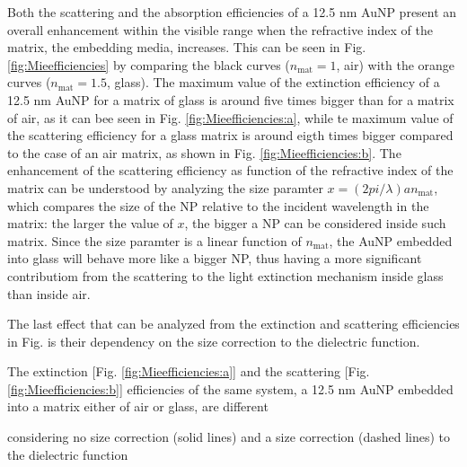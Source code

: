 Both the scattering and the absorption efficiencies of a 12.5 nm AuNP present an overall enhancement within the visible range when the refractive index of the matrix, the embedding media,  increases. This can be seen in Fig. \ref{fig:Mieefficiencies} by comparing the black curves ($n_\text{mat} = 1$, air) with the orange curves ($n_\text{mat} = 1.5$, glass). The maximum value of the extinction efficiency of a 12.5 nm AuNP for a matrix of glass is around five times bigger than for a matrix of air, as it can bee seen in Fig. \ref{fig:Mieefficiencies:a}, while te maximum value of the scattering efficiency for a glass matrix is around eigth times bigger compared to the case of an air matrix, as shown in Fig. \ref{fig:Mieefficiencies:b}. The enhancement of the scattering efficiency as function of the refractive index of the matrix can be understood by analyzing the size paramter $ x = (2 pi / \lambda ) a n_\text{mat} $, which compares the size of the NP relative to the incident wavelength in the matrix: the larger the value of $x$, the bigger a NP can be considered inside such matrix. Since the size paramter is a linear function of $n_\text{mat}$, the AuNP embedded into glass will behave more like a bigger NP, thus having a more significant contributiom from the scattering to the  light extinction mechanism inside  glass than inside air.

The last effect that can be analyzed from the extinction and scattering efficiencies in Fig.  is their dependency on the size correction to the dielectric function.

The extinction [Fig. \ref{fig:Mieefficiencies:a}] and the scattering [Fig. \ref{fig:Mieefficiencies:b}] efficiencies of the same system, a 12.5 nm AuNP embedded into a matrix either of air or glass, are different


 considering no size correction (solid lines) and a size correction (dashed lines) to the dielectric function









